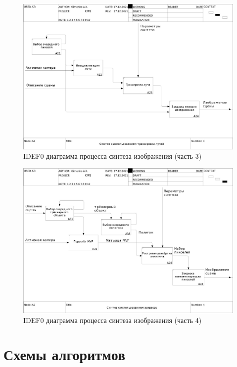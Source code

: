 \begin{figure}
    \centering
    \includegraphics[width=\linewidth,height=0.85\textheight,keepaspectratio]{idef0/03_A2.jpg}
    \caption{IDEF0 диаграмма процесса синтеза изображения (часть 3)}
    \label{idef0:render:3}
\end{figure}

\begin{figure}
    \centering
    \includegraphics[width=\linewidth,height=0.85\textheight,keepaspectratio]{idef0/04_A3.jpg}
    \caption{IDEF0 диаграмма процесса синтеза изображения (часть 4)}
    \label{idef0:render:4}
\end{figure}

\clearpage

\section{Схемы алгоритмов}

